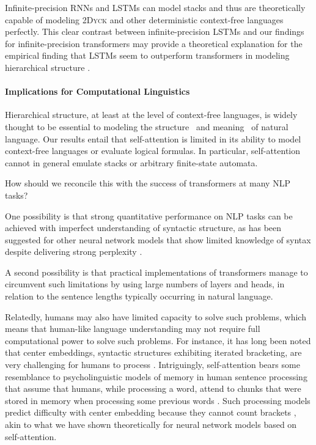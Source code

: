 \documentclass[11pt,a4paper]{article}
\begin{document}
Infinite-precision RNNs and LSTMs can model stacks \cite{tabor2000fractal,gruning2006stack,kirov2012processing} and thus are theoretically capable of modeling \textsc{2Dyck} and other deterministic context-free languages perfectly. %
This clear contrast between infinite-precision LSTMs and our findings for infinite-precision transformers may provide a theoretical explanation for the empirical finding that LSTMs seem to outperform transformers in modeling hierarchical structure \citep{tran2018importance}.

\paragraph{Implications for Computational Linguistics}
Hierarchical structure, at least at the level of context-free languages, is widely thought to be essential to modeling the structure~\cite{everaert2015structures} and meaning~\cite{montague1973proper} of natural language.
Our results entail that self-attention is limited in its ability to model context-free languages or evaluate logical formulas.
In particular, self-attention cannot in general emulate stacks or arbitrary finite-state automata.

How should we reconcile this with the success of transformers at many NLP tasks?

One possibility is that strong quantitative performance on NLP tasks can be achieved with imperfect understanding of syntactic structure, as has been suggested for other neural network models that show limited knowledge of syntax despite delivering strong perplexity  \cite{linzen2016assessing,marvin2018targeted}.

A second possibility is that practical implementations of transformers manage to circumvent such limitations by using large numbers of layers and heads, in relation to the sentence lengths typically occurring in natural language.

Relatedly, humans may also have limited capacity to solve such problems, which means that human-like language understanding may not require full computational power to solve such problems.
For instance, it has long been noted that center embeddings, syntactic structures exhibiting iterated bracketing, are very challenging for humans to process \cite{miller-finitary-1963,gibson1999memory}.
Intriguingly, self-attention bears some resemblance to psycholinguistic models of memory in human sentence processing that assume that humans, while processing a word, attend to chunks that were stored in memory when processing some previous words \cite{lewis2005activation,parker2017cue}.
Such processing models predict difficulty with center embedding because they cannot count brackets \cite{lewis2005activation}, akin to what we have shown theoretically for neural network models based on self-attention.
\end{document}
